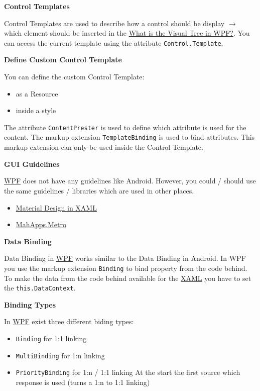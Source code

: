 \documentclass[10pt,twoside,landscape]{article}
\begin{document}
\begin{multicols}{4}
\textbf{Control Templates}

Control Templates are used to describe how a control should be display \(\rightarrow\) which element should be inserted in the \href{../../../roam/20211123163209-what_is_the_visual_tree_in_wpf.org}{What is the Visual Tree in WPF?}.
You can access the current template using the attribute \texttt{Control.Template}.

\textbf{Define Custom Control Template}

You can define the custom Control Template:
\begin{itemize}
\item as a Resource
\item inside a style
\end{itemize}


The attribute \texttt{ContentPrester} is used to define which attribute is used for the content.
The markup extension \texttt{TemplateBinding} is used to bind attributes.
This markup extension can only be used inside the Control Template.

\textbf{GUI Guidelines}

\href{../../../roam/20211123162923-wpf.org}{WPF} does not have any guidelines like Android.
However, you could / should use the same guidelines / libraries which are used in other places.
\begin{itemize}
\item \href{https://github.com/MaterialDesignInXAML/MaterialDesignInXamlToolkit}{Material Design in XAML}
\item \href{https://mahapps.com/docs/guides/quick-start}{MahApps.Metro}
\end{itemize}

\textbf{Data Binding}

Data Binding in \href{../../../roam/20211123162923-wpf.org}{WPF} works similar to the Data Binding in Android.
In WPF you use the markup extension \texttt{Binding} to bind property from the code behind.
To make the data from the code behind available for the \href{../../../roam/20211123162058-xaml.org}{XAML} you have to set the \texttt{this.DataContext}.

\textbf{Binding Types}

In \href{../../../roam/20211123162923-wpf.org}{WPF} exist three different biding types:
\begin{itemize}
\item \texttt{Binding} for 1:1 linking
\item \texttt{MultiBinding} for 1:n linking
\item \texttt{PriorityBinding} for 1:n / 1:1 linking
At the start the first source which response is used (turns a 1:n to 1:1 linking)
\end{itemize}


\end{multicols}
\end{document}
